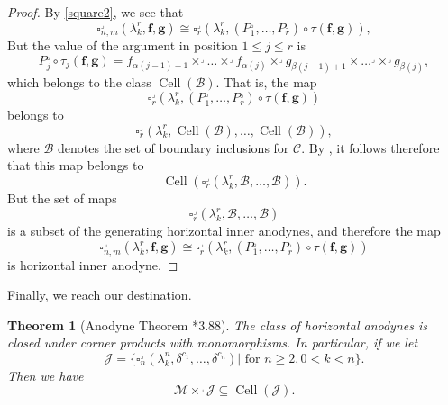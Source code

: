 \documentclass[a4paper]{article}
\numberwithin{equation}{subsection}
\theoremstyle{plain}   %
\newtheorem{thm}[equation]{Theorem}
\theoremstyle{definition}
\theoremstyle{remark}
\theoremstyle{plain}
\providecommand{\C}{}
\renewcommand{\C}{\ensuremath{\mathcal{C}}}
\begin{document}
\begin{proof}
	By \ref{square2}, we see that 
	\[
		\square^\lrcorner_{n,m}(\lambda^r_k,\mathbf{f},\mathbf{g}) \cong \square^\lrcorner_r(\lambda^r_k, (P_1^\lrcorner,\dots, P_r^\lrcorner) \circ \tau(\mathbf{f},\mathbf{g})),
	\]
	But the value of the argument in position \(1\leq j \leq r\) is 
	\[
		P_j^\lrcorner\circ \tau_j(\mathbf{f},\mathbf{g})=f_{\alpha(j-1)+1}\times^\lrcorner \dots \times^\lrcorner f_{\alpha(j)} \times^\lrcorner g_{\beta(j-1)+1}\times \dots^\lrcorner \times^\lrcorner g_{\beta(j)},
	\]
	which belongs to the class \(\operatorname{Cell}(\mathscr{B})\). That is, the map 
	\[
		\square^\lrcorner_r(\lambda^r_k, (P_1^\lrcorner,\dots, P_r^\lrcorner) \circ \tau(\mathbf{f},\mathbf{g}))
	\]
	belongs to 
	\[
		\square^\lrcorner_{r}(\lambda^r_k, \operatorname{Cell}(\mathscr{B}), \dots, \operatorname{Cell}(\mathscr{B})),
	\]
	where \(\mathscr{B}\) denotes the set of boundary inclusions for \(\C\).  By , it follows therefore that this map belongs to 
	\[
		\operatorname{Cell}(\square^\lrcorner_{r}(\lambda^r_k, \mathscr{B}, \dots, \mathscr{B})).
	\]
	But the set of maps
	\[
		\square^\lrcorner_{r}(\lambda^r_k, \mathscr{B}, \dots, \mathscr{B})
	\]
	is a subset of the generating horizontal inner anodynes, and therefore the map
	\[
		\square^\lrcorner_{n,m}(\lambda^r_k,\mathbf{f},\mathbf{g})\cong \square^\lrcorner_r(\lambda^r_k, (P_1^\lrcorner,\dots, P_r^\lrcorner) \circ \tau(\mathbf{f},\mathbf{g}))
	\]
	is horizontal inner anodyne.
\end{proof}
Finally, we reach our destination.
\begin{thm}[Anodyne Theorem \cite{oury}*{3.88}]\label{anodynethm}
	The class of horizontal anodynes is closed under corner products with monomorphisms.  In particular, if we let \[\mathscr{J}=\{\square_n^\lrcorner(\lambda^n_k, \delta^{c_1},\dots,\delta^{c_n})| \text{ for } n\geq 2, 0<k<n\}.\] Then we have
	\[\mathscr{M}\times^\lrcorner \mathscr{J} \subseteq \operatorname{Cell}(\mathscr{J}).\]
\end{thm}
\end{document}

